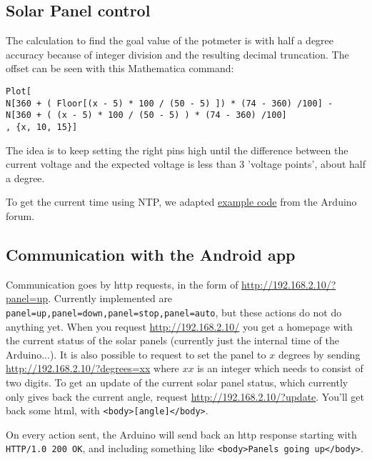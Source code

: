\documentclass{article}
\begin{document}
		\subsection{Solar Panel control}
			The calculation to find the goal value of the potmeter is with half a degree accuracy because of integer division and the resulting decimal truncation. The offset can be seen with this Mathematica command:
			\begin{lstlisting}
Plot[
N[360 + ( Floor[(x - 5) * 100 / (50 - 5) ]) * (74 - 360) /100] - 
N[360 + ( (x - 5) * 100 / (50 - 5) ) * (74 - 360) /100]
, {x, 10, 15}]
			\end{lstlisting}
			The idea is to keep setting the right pins high until the difference between the current voltage and the expected voltage is less than 3 'voltage points', about half a degree.
			
			To get the current time using NTP, we adapted \href{http://forum.arduino.cc/index.php?topic=171941.0}{example code} from the Arduino forum.
			
		\subsection{Communication with the Android app}
			Communication goes by http requests, in the form of \url{http://192.168.2.10/?panel=up}. Currently implemented are \verb|panel=up,panel=down,panel=stop,panel=auto|, but these actions do not do anything yet. When you request \url{http://192.168.2.10/} you get a homepage with the current status of the solar panels (currently just the internal time of the Arduino...). It is also possible to request to set the panel to $x$ degrees by sending \url{http://192.168.2.10/?degrees=xx} where $xx$ is an integer which needs to consist of two digits. To get an update of the current solar panel status, which currently only gives back the current angle, request \url{http://192.168.2.10/?update}. You'll get back some html, with \verb|<body>[angle]</body>|.
			
			On every action sent, the Arduino will send back an http response starting with \verb|HTTP/1.0 200 OK|, and including something like \verb|<body>Panels going up</body>|.
	
\end{document}
